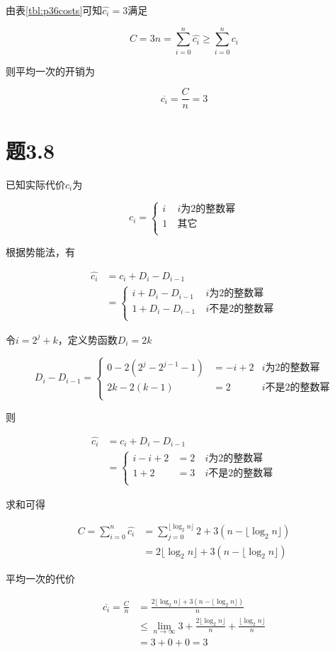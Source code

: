 \documentclass[a4paper,twoside]{article}
\begin{document}
\begin{spacing}{1.2}
由表\ref{tbl:p36costs}可知$\hat{c_i}=3$满足

$$
C=3n=\sum_{i=0}^{n}\hat{c_i} \ge \sum_{i=0}^{n}{c_i}
$$

则平均一次的开销为

$$
 \overline{c_i}=\frac{C}{n}=3
$$

\section{题3.8}

已知实际代价$c_i$为

$$ c_i=\left\{
\begin{aligned}
	i & \  \mbox{$i$为$2$的整数幂} \\
	1 & \  \mbox{其它} \\
\end{aligned}
\right.
$$

根据势能法，有

\begin{align*}
	\hat{c_i}&=c_i+D_i-D_{i-1}\\
	&=\left\{
	\begin{aligned}
		i+D_i-D_{i-1} & \  \mbox{$i$为$2$的整数幂} \\
		1+D_i-D_{i-1} & \  \mbox{$i$不是$2$的整数幂} \\
	\end{aligned}
	\right.
\end{align*}


令$i=2^j+k$，定义势函数$D_i=2k$

$$
D_i-D_{i-1}=\left\{
\begin{aligned}
	0-2(2^j-2^{j-1}-1)&=-i+2 &  \mbox{$i$为$2$的整数幂} \\
	2k-2(k-1)&=2  &  \mbox{$i$不是$2$的整数幂} \\
\end{aligned}
\right.
$$

则


\begin{align*}
	\hat{c_i}&=c_i+D_i-D_{i-1}\\
	&=\left\{
	\begin{aligned}
		i-i+2 &= 2 & \  \mbox{$i$为$2$的整数幂} \\
		1+2 &= 3 & \  \mbox{$i$不是$2$的整数幂} \\
	\end{aligned}
	\right.
\end{align*}

求和可得

\begin{align*}
	C=\sum_{i=0}^{n}{\hat{c_i}}&=\sum_{j=0}^{\lfloor \log_2 n \rfloor}2+3(n-\lfloor \log_2 n \rfloor) \\
	&= 2{\lfloor \log_2 n \rfloor}+3(n-\lfloor \log_2 n \rfloor)
\end{align*}

平均一次的代价


\begin{align*}
 \overline{c_i}=\frac{C}{n}&= \frac{2{\lfloor \log_2 n \rfloor}+3(n-\lfloor \log_2 n \rfloor)}{n} \\
 & \le \lim_{n \to \infty}{3+\frac{2{\lfloor \log_2 n \rfloor}}{n}+\frac{\lfloor \log_2 n \rfloor}{n}} \\
 &= 3+0+0=3
\end{align*}

\end{spacing}
\end{document}
